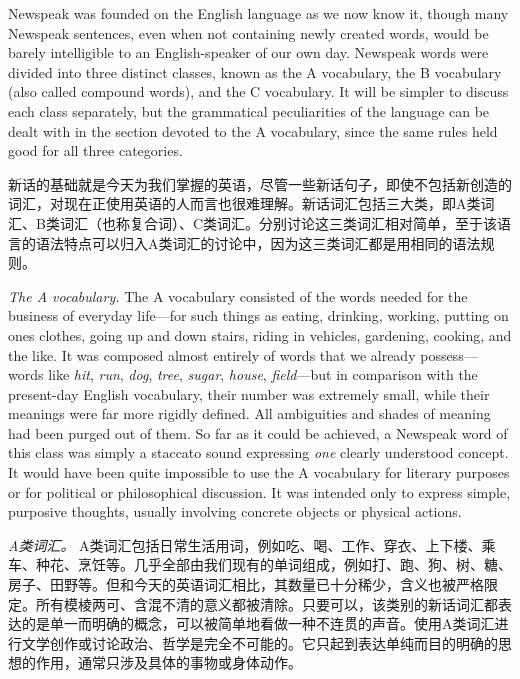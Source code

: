 \begin{paracol}{2}
\switchcolumn*

Newspeak was founded on the English language as we now know it, though
many Newspeak sentences, even when not containing newly created words,
would be barely intelligible to an English-speaker of our own day.
Newspeak words were divided into three distinct classes, known as the A
vocabulary, the B vocabulary (also called compound words), and the C
vocabulary. It will be simpler to discuss each class separately, but the
grammatical peculiarities of the language can be dealt with in the
section devoted to the A vocabulary, since the same rules held good for
all three categories.

\switchcolumn

新话的基础就是今天为我们掌握的英语，尽管一些新话句子，即使不包括新创造的词汇，对现在正使用英语的人而言也很难理解。新话词汇包括三大类，即A类词汇、B类词汇（也称复合词）、C类词汇。分别讨论这三类词汇相对简单，至于该语言的语法特点可以归入A类词汇的讨论中，因为这三类词汇都是用相同的语法规则。

\switchcolumn*

\sectionbreak

\switchcolumn

\sectionbreak

\switchcolumn*

\emph{The A vocabulary.} The A vocabulary consisted of the words needed
for the business of everyday life---for such things as eating, drinking,
working, putting on one\textquotesingle s clothes, going up and down
stairs, riding in vehicles, gardening, cooking, and the like. It was
composed almost entirely of words that we already possess---words like
\emph{hit}, \emph{run}, \emph{dog}, \emph{tree}, \emph{sugar},
\emph{house}, \emph{field}---but in comparison with the present-day
English vocabulary, their number was extremely small, while their
meanings were far more rigidly defined. All ambiguities and shades of
meaning had been purged out of them. So far as it could be achieved, a
Newspeak word of this class was simply a staccato sound expressing
\emph{one} clearly understood concept. It would have been quite
impossible to use the A vocabulary for literary purposes or for
political or philosophical discussion. It was intended only to express
simple, purposive thoughts, usually involving concrete objects or
physical actions.

\switchcolumn

\emph{A类词汇。} A类词汇包括日常生活用词，例如吃、喝、工作、穿衣、上下楼、乘车、种花、烹饪等。几乎全部由我们现有的单词组成，例如打、跑、狗、树、糖、房子、田野等。但和今天的英语词汇相比，其数量已十分稀少，含义也被严格限定。所有模棱两可、含混不清的意义都被清除。只要可以，该类别的新话词汇都表达的是单一而明确的概念，可以被简单地看做一种不连贯的声音。使用A类词汇进行文学创作或讨论政治、哲学是完全不可能的。它只起到表达单纯而目的明确的思想的作用，通常只涉及具体的事物或身体动作。


\end{paracol}
